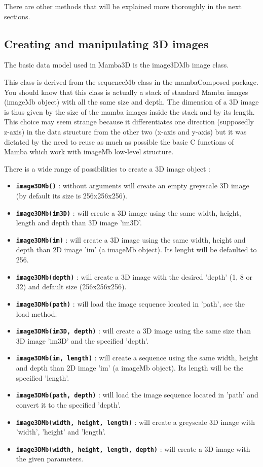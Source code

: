 \documentclass[a4paper,10pt,oneside]{article}
\begin{document}
There are other methods that will be explained more thoroughly in the next sections.

\subsection{Creating and manipulating 3D images}

The basic data model used in Mamba3D is the image3DMb image class.

This class is derived from the sequenceMb class in the mambaComposed package.
You should know that this class is actually a stack of standard Mamba images
(imageMb object) with all the same size and depth. The dimension of a 3D image
is thus given by the size of the mamba images inside the stack and by its
length. This choice may seem strange because it differentiates one direction
(supposedly z-axis) in the data structure from the other two (x-axis and
y-axis) but it was dictated by the need to reuse as much as possible the 
basic C functions of Mamba which work with imageMb low-level structure.

There is a wide range of possibilities to create a 3D image object :
\begin{itemize}
\item \texttt{\textbf{image3DMb()}} : without arguments will create an empty
greyscale 3D image (by default its size is 256x256x256).
\item \texttt{\textbf{image3DMb(im3D)}} : will create a 3D image using the
same width, height, length and depth than 3D image 'im3D'.
\item \texttt{\textbf{image3DMb(im)}} : will create a 3D image using the same
width, height and depth than 2D image 'im' (a imageMb object). Its
lenght will be defaulted to 256.
\item \texttt{\textbf{image3DMb(depth)}} : will create a 3D image with the
desired 'depth' (1, 8 or 32) and default size (256x256x256).
\item \texttt{\textbf{image3DMb(path)}} : will load the image sequence located
in 'path', see the load method.
\item \texttt{\textbf{image3DMb(im3D, depth)}} : will create a 3D image using
the same size than 3D image 'im3D' and the specified 'depth'.
\item \texttt{\textbf{image3DMb(im, length)}} : will create a sequence using
the same width, height and depth than 2D image 'im' (a imageMb object). Its
length will be the specified 'length'.
\item \texttt{\textbf{image3DMb(path, depth)}} : will load the image sequence
located in 'path' and convert it to the specified 'depth'.
\item \texttt{\textbf{image3DMb(width, height, length)}} : will create a 
greyscale 3D image with 'width', 'height' and 'length'.
\item \texttt{\textbf{image3DMb(width, height, length, depth)}} : will create
a 3D image with the given parameters.
\end{itemize}
\end{document}
